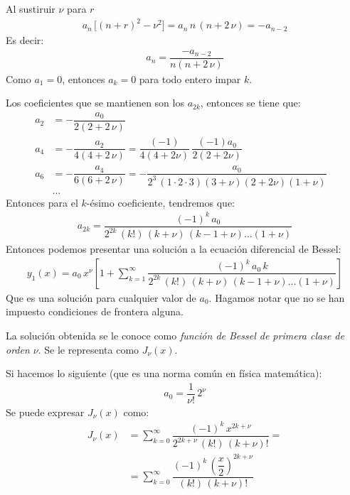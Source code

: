Al sustiruir $\nu$ para $r$
\begin{align*}
a_{n} \, \big[ (n + r)^{2} - \nu^{2} \big] = a_{n} \, n \, (n + 2 \, \nu) = - a_{n-2}
\end{align*}
Es decir:
\begin{align*}
a_{n} = \dfrac{- a_{n-2}}{n (n + 2 \, \nu)}
\end{align*}
Como $a_{1} = 0$, entonces $a_{k} = 0$ para todo entero impar $k$.
\par
Los coeficientes que se mantienen son los $a_{2 k}$, entonces se tiene que:
\begin{align*}
a_{2} &= - \dfrac{a_{0}}{2 (2 + 2 \, \nu)} \\[0.5em]
a_{4} &= - \dfrac{a_{2}}{4 (4 + 2 \, \nu)} = \dfrac{(-1)}{4 (4 + 2 \nu)} \, \dfrac{(-1)a_{0}}{2 (2 + 2 \nu)} \\[0.5em]
a_{6} &= - \dfrac{a_{4}}{6 (6 + 2 \, \nu)} = - \dfrac{a_{0}}{2^{3} \, (1 \cdot 2 \cdot 3) (3 + \nu)(2 + 2 \nu)(1 + \nu)}\\
&\ldots&
\end{align*}
Entonces para el $k$-ésimo coeficiente, tendremos que:
\begin{align*}
a_{2k} = \dfrac{(-1)^{k} \, a_{0}}{2^{2 k} \, (k!) \, (k + \nu) \, (k - 1 + \nu) \ldots (1 + \nu)}
\end{align*}
Entonces podemos presentar una solución a la ecuación diferencial de Bessel:
\begin{align*}
y_{1}(x) = a_{0} \, x^{\nu} \left[ 1 + \sum_{k=1}^{\infty} \dfrac{(-1)^{k} \, a_{0} \, k}{2^{2 k} \, (k!) \, (k + \nu) \, (k -1 + \nu)\ldots (1 + \nu)} \right]
\end{align*}
Que es una solución para cualquier valor de $a_{0}$. Hagamos notar que no se han impuesto condiciones de frontera alguna.
\par
La solución obtenida se le conoce como \emph{función de Bessel de primera clase de orden $\nu$}. Se le representa como $J_{\nu} (x)$.
\par
Si hacemos lo siguiente (que es una norma común en física matemática):
\begin{align*}
a_{0} = \dfrac{1}{\nu!} \, 2^{\nu}
\end{align*}
Se puede expresar $J_{\nu}(x)$ como:
\begin{align*}
J_{\nu}(x) &= \sum_{k=0}^{\infty} \dfrac{(-1)^{k} \, x^{2k+\nu}}{2^{2k+\nu} \, (k!) \, (k + \nu)!} = \\[1em]
&= \sum_{k=0}^{\infty} \dfrac{(-1)^{k} \, \left( \dfrac{x}{2}\right)^{2k+\nu}}{(k!) \, (k + \nu)!}
\end{align*}

